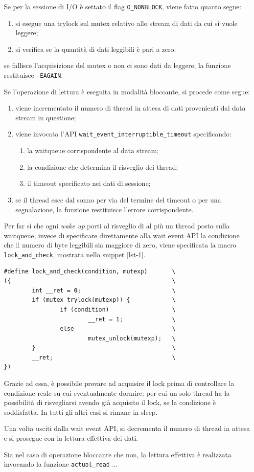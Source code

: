 \documentclass{article}
\begin{document}
Se per la sessione di I/O è settato il flag \texttt{O\_NONBLOCK}, viene fatto quanto segue:
\begin{enumerate}
\item si esegue una trylock sul mutex relativo allo stream di dati da cui si vuole leggere;
\item si verifica se la quantità di dati leggibili è pari a zero;
\end{enumerate}
se fallisce l'acquisizione del mutex o non ci sono dati da leggere, la funzione restituisce \texttt{-EAGAIN}.

Se l'operazione di lettura è eseguita in modalità bloccante, si procede come segue:
\begin{enumerate}
\item viene incrementato il numero di thread in attesa di dati provenienti dal data stream in questione;
\item viene invocata l'API \texttt{wait\_event\_interruptible\_timeout} specificando:
\begin{enumerate}
\item la waitqueue corrispondente al data stream;
\item la condizione che determina il risveglio dei thread;
\item il timeout specificato nei dati di sessione;
\end{enumerate}
\item se il thread esce dal sonno per via del termine del timeout o per una segnalazione, la funzione restituisce l'errore corrispondente.
\end{enumerate}
Per far sì che ogni \textsl{wake up} porti al risveglio di al più un thread posto sulla waitqueue, invece di specificare direttamente alla wait event API la condizione che il numero di byte leggibili sia maggiore di zero, viene specificata la macro \texttt{lock\_and\_check}, mostrata nello snippet \ref{lst-1}.
\begin{lstlisting}[label=lst-1, caption={Macro \texttt{lock\_and\_check}}]
#define lock_and_check(condition, mutexp)       \
({                                              \
        int __ret = 0;                          \
        if (mutex_trylock(mutexp)) {            \
                if (condition)                  \
                        __ret = 1;              \
                else                            \
                        mutex_unlock(mutexp);   \
        }                                       \
        __ret;                                  \
})
\end{lstlisting}
Grazie ad essa, è possibile provare ad acquisire il lock prima di controllare la condizione reale su cui eventualmente dormire; per cui un solo thread ha la possibilità di risvegliarsi avendo già acquisito il lock, se la condizione è soddisfatta. In tutti gli altri casi si rimane in sleep.

Una volta usciti dalla wait event API, si decrementa il numero di thread in attesa e si prosegue con la lettura effettiva dei dati.

Sia nel caso di operazione bloccante che non, la lettura effettiva è realizzata invocando la funzione \texttt{actual\_read} ...
\end{document}
